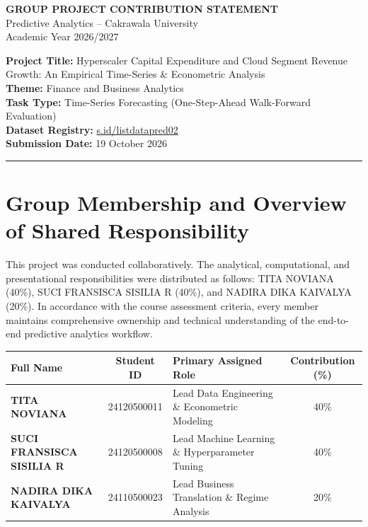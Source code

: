 \documentclass[11pt,a4paper]{article}
\begin{document}
\begin{center}
    {\Large \textbf{GROUP PROJECT CONTRIBUTION STATEMENT}}\\[0.4em]
    {\large Predictive Analytics -- Cakrawala University}\\[0.2em]
    {\normalsize Academic Year 2026/2027}\\[1em]
\end{center}

\noindent\textbf{Project Title:} Hyperscaler Capital Expenditure and Cloud Segment Revenue Growth: An Empirical Time-Series \& Econometric Analysis \\
\textbf{Theme:} Finance and Business Analytics \\
\textbf{Task Type:} Time-Series Forecasting (One-Step-Ahead Walk-Forward Evaluation) \\
\textbf{Dataset Registry:} \url{s.id/listdatapred02} \\
\textbf{Submission Date:} 19 October 2026

\vspace{0.8em}
\noindent\rule{\linewidth}{1.2pt}

\section{Group Membership and Overview of Shared Responsibility}

This project was conducted collaboratively. The analytical, computational, and presentational responsibilities were distributed as follows: TITA NOVIANA (40\%), SUCI FRANSISCA SISILIA R (40\%), and NADIRA DIKA KAIVALYA (20\%). In accordance with the course assessment criteria, every member maintains comprehensive ownership and technical understanding of the end-to-end predictive analytics workflow.

\vspace{0.5em}
\begin{table}[h!]
\centering
\small
\renewcommand{\arraystretch}{1.3}
\begin{tabularx}{\linewidth}{p{4.5cm} c p{5.5cm} c}
\toprule
\textbf{Full Name} & \textbf{Student ID} & \textbf{Primary Assigned Role} & \textbf{Contribution (\%)} \\
\midrule
\textbf{TITA NOVIANA} & 24120500011 & Lead Data Engineering \& Econometric Modeling & 40\% \\
\textbf{SUCI FRANSISCA SISILIA R} & 24120500008 & Lead Machine Learning \& Hyperparameter Tuning & 40\% \\
\textbf{NADIRA DIKA KAIVALYA} & 24110500023 & Lead Business Translation \& Regime Analysis & 20\% \\
\bottomrule
\end{tabularx}
\end{table}
\end{document}
